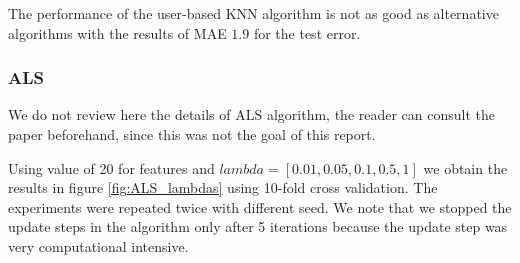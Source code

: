 \begin{figure}[h]
\begin{minipage}{\textwidth}
    \label{fig:KNN_kvalues}
  \end{minipage}
\end{figure}

The performance of the user-based KNN algorithm is not as good as alternative algorithms with the results of MAE $1.9$ for the test error. 

\subsubsection{ALS}
We do not review here the details of ALS algorithm, the reader can consult the paper \cite{Zhou:2008} beforehand, since this was not the goal of this report.

Using value of 20 for features and $lambda=[0.01,0.05,0.1,0.5,1]$ we obtain the results in figure \ref{fig:ALS_lambdas} using 10-fold cross validation. The experiments were repeated twice with different seed. We note that we stopped the update steps in the algorithm only after 5 iterations because the update step was very computational intensive.

